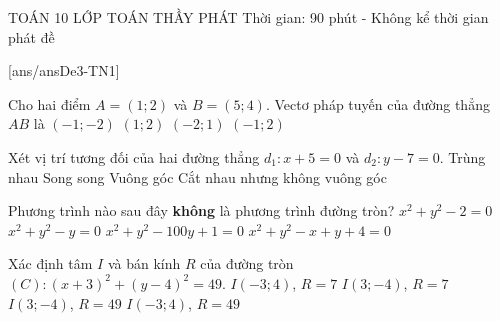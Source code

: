 \begin{name}
	{\tenchude}
	{TOÁN 10}
	{LỚP TOÁN THẦY PHÁT}
	{Thời gian: 90 phút - Không kể thời gian phát đề}
\end{name}
\TN
{}[ans/ansDe3-TN1]
\begin{ex}%
	Cho hai điểm $A=\left( 1;2 \right)$ và $B=\left( 5;4 \right)$. Vectơ pháp tuyến của đường thẳng $AB$ là
	\choice
	{$\left( -1;-2 \right)$}
	{$\left( 1;2 \right)$}
	{$\left( -2;1 \right)$}
	{\True $\left( -1;2 \right)$}
\end{ex}

\begin{ex}%
	Xét vị trí tương đối của hai đường thẳng $d_1\colon x+5=0$ và $d_2\colon y-7=0$.
	\choice
	{Trùng nhau}
	{Song song}
	{\True Vuông góc}
	{Cắt nhau nhưng không vuông góc}
\end{ex}

\begin{ex}%
	Phương trình nào sau đây \textbf{không} là phương trình đường tròn?
	\choice
	{\True $x^2+y^2-2=0$}
	{$x^2+y^2-y=0$}
	{$x^2+y^2-100y+1=0$}
	{$x^2+y^2-x+y+4=0$}
\end{ex}

\begin{ex}%
	Xác định tâm $I$ và bán kính $R$ của đường tròn $(C)\colon (x+3)^2+(y-4)^2=49$.
	\choice
	{\True $I(-3;4)$, $R=7$}
	{$I(3;-4)$, $R=7$}
	{$I(3;-4)$, $R=49$}
	{$I(-3;4)$, $R=49$}
\end{ex}

